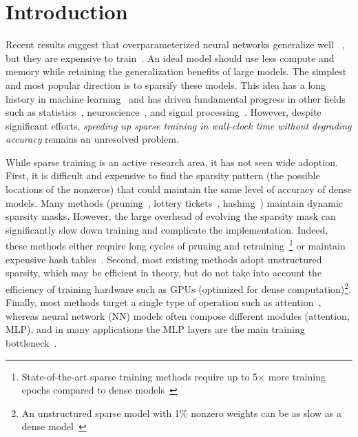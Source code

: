 \section{Introduction}
\label{sec:intro}



Recent results suggest that overparameterized neural networks generalize well ~\citep{belkin2019reconciling}, but they are expensive to train~\citep{kaplan2020scaling}. An ideal model should use less compute and memory while retaining the generalization benefits of large models. The simplest and most popular direction is to sparsify these models. 
This idea has a long history in machine learning~\citep{lecun1990optimal} and has driven fundamental progress in other fields such as statistics~\citep{tibshirani1996regression}, neuroscience~\citep{foldiak2003sparse}, and signal processing~\citep{candes2006stable}. 
However, despite significant efforts, {\em speeding up sparse training in wall-clock time without degrading accuracy} remains an unresolved problem.




While sparse training is an active research area, it has not seen wide adoption.
First, it is difficult and expensive to find the sparsity pattern (the possible locations of the nonzeros) that could maintain the same level of accuracy of dense models.
Many methods (pruning~\citep{lee2018snip}, lottery tickets~\citep{frankle2018lottery}, hashing~\citep{kitaev2020reformer}) maintain dynamic sparsity masks.
However, the large overhead of evolving the sparsity mask can significantly slow down training and complicate the implementation. Indeed, these methods either require long cycles of pruning and retraining~\citep{frankle2018lottery}\footnote{State-of-the-art sparse training methods require up to 5$\times$ more training epochs compared to dense models~\citep{evci2020rigging}} or maintain expensive hash tables~\citep{chen2019slide}.
Second, most existing methods adopt unstructured sparsity, which may be efficient in theory, but do not take into account the efficiency of training hardware such as GPUs (optimized for dense computation)\footnote{An unstructured sparse model with 1\% nonzero weights can be as slow as a dense model~\citep{hooker2020hardware}}.
Finally, most methods target a single type of operation such as attention~\citep{child2019generating,zaheer2020bigbird}, whereas neural network (NN) models often compose different modules (attention, MLP), and in many applications the MLP layers are the main training bottleneck~\citep{wu2020lite}.


